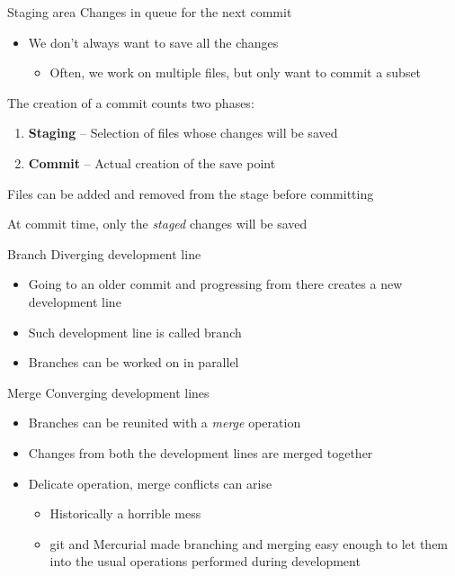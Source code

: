 \documentclass[presentation]{beamer}
\begin{document}
\begin{frame}{Staging area}
    Changes in queue for the next commit
    \begin{itemize}
        \item We don't always want to save all the changes
        \begin{itemize}
            \item Often, we work on multiple files, but only want to commit a subset
        \end{itemize}
    \end{itemize}
    The creation of a commit counts two phases:
    \begin{enumerate}
        \item \textbf{Staging} -- Selection of files whose changes will be saved
        \item \textbf{Commit} -- Actual creation of the save point
    \end{enumerate}
    Files can be added and removed from the stage before committing
    
    At commit time, only the \emph{staged} changes will be saved
\end{frame}

\begin{frame}{Branch}
    Diverging development line
    \begin{itemize}
        \item Going to an older commit and progressing from there creates a new development line
        \item Such development line is called branch
        \item Branches can be worked on in parallel
    \end{itemize}
\end{frame}

\begin{frame}{Merge}
    Converging development lines
    \begin{itemize}
        \item Branches can be reunited with a \emph{merge} operation
        \item Changes from both the development lines are merged together
        \item Delicate operation, merge conflicts can arise
        \begin{itemize}
            \item Historically a horrible mess
            \item git and Mercurial made branching and merging easy enough to let them into the usual operations performed during development
        \end{itemize}
    \end{itemize}
\end{frame}
\end{document}
